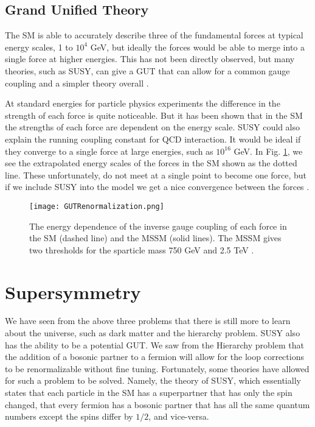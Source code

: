 \subsection{Grand Unified Theory}

The SM is able to accurately describe three of the fundamental forces at typical energy scales, 1 to $10^{4}$ GeV, but ideally the forces would be able to merge into a single force at higher energies. This has not been directly observed, but many theories, such as SUSY, can give a GUT \cite{georgi_unity_1974, georgi_hierarchy_1974, buras_aspects_1978} that can allow for a common gauge coupling and a simpler theory overall \cite{martin_supersymmetry_1997}.

At standard energies for particle physics experiments the difference in the strength of each force is quite noticeable. But it has been shown that in the SM the strengths of each force are dependent on the energy scale. SUSY could also explain the running coupling constant for QCD interaction. It would be ideal if they converge to a single force at large energies, such as $10^{16}$ GeV. In Fig. \ref{GUT}, we see the extrapolated energy scales of the forces in the SM shown as the dotted line. These unfortunately, do not meet at a single point to become one force, but if we include SUSY into the model we get a nice convergence between the forces \cite{martin_supersymmetry_1997}.

\begin{figure}
 	\centering
	\texttt{[image: GUTRenormalization.png]}
 	\caption[GUT Force Energy Dependence]{The energy dependence of the inverse gauge coupling of each force in the SM (dashed line) and the MSSM (solid lines). The MSSM gives two thresholds for the sparticle mass 750 GeV and 2.5 TeV \cite{martin_supersymmetry_1997}.}
 	\label{GUT} 
\end{figure}

\section{Supersymmetry}\label{sec:SUSY}

We have seen from the above three problems that there is still more to learn about the universe, such as dark matter and the hierarchy problem. SUSY \cite{ramond_dual_1971, volkov_possible_1972, wess_supergauge_1974, fayet_supergauge_1975, barbieri_gauge_1982, chamseddine_locally_1982, hall_supergravity_1983, kane_study_1994, papucci_natural_2012} also has the ability to be a potential GUT. We saw from the Hierarchy problem that the addition of a bosonic partner to a fermion will allow for the loop corrections to be renormalizable without fine tuning. Fortunately, some theories have allowed for such a problem to be solved. Namely, the theory of SUSY, which essentially states that each particle in the SM has a superpartner that has only the spin changed, that every fermion has a bosonic partner that has all the same quantum numbers except the spins differ by $1/2$, and vice-versa.

